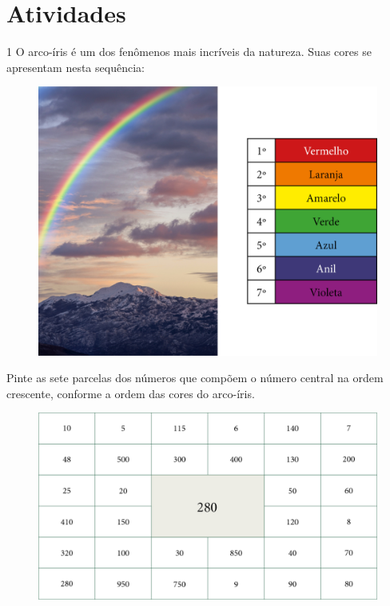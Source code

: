 \pagebreak
\section*{Atividades}

\num{1} O arco-íris é um dos fenômenos mais incríveis da natureza. Suas cores
se apresentam nesta sequência:


\begin{figure}[H]
\centering
\includegraphics[width=.7\textwidth]{./media/image21.png}
\end{figure}


Pinte as sete parcelas dos números que compõem o número central na ordem
crescente, conforme a ordem das cores do arco-íris.

\begin{figure}[H]
\centering
\includegraphics[width=.9\textwidth]{./media/image22.png}
\end{figure}

